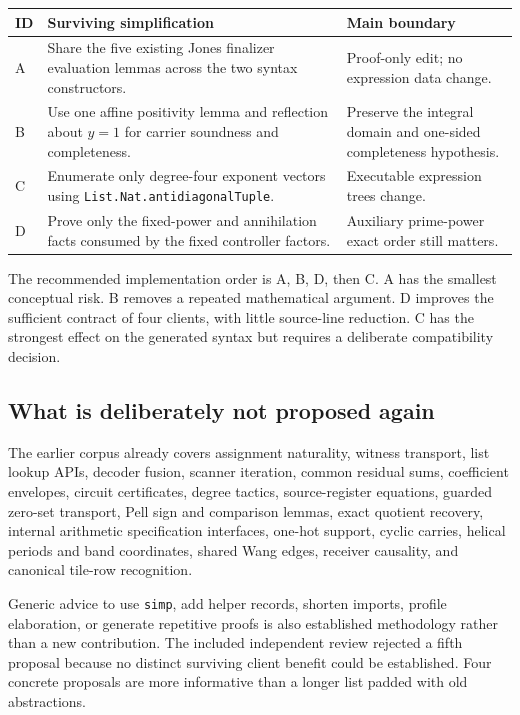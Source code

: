 \documentclass[11pt,letterpaper]{article}
\newcommand{\code}[1]{{\small\nolinkurl{#1}}}
\begin{document}
\begin{tabularx}{\textwidth}{@{}p{}X p{}@{}}
\toprule
ID & Surviving simplification & Main boundary \\
\midrule
A & Share the five existing Jones finalizer evaluation lemmas across the two syntax constructors. & Proof-only edit; no expression data change. \\
B & Use one affine positivity lemma and reflection about $y=1$ for carrier soundness and completeness. & Preserve the integral domain and one-sided completeness hypothesis. \\
C & Enumerate only degree-four exponent vectors using \code{List.Nat.antidiagonalTuple}. & Executable expression trees change. \\
D & Prove only the fixed-power and annihilation facts consumed by the fixed controller factors. & Auxiliary prime-power exact order still matters. \\
\bottomrule
\end{tabularx}

The recommended implementation order is A, B, D, then C. A has the smallest conceptual risk. B removes a repeated mathematical argument. D improves the sufficient contract of four clients, with little source-line reduction. C has the strongest effect on the generated syntax but requires a deliberate compatibility decision.

\subsection{What is deliberately not proposed again}

The earlier corpus already covers assignment naturality, witness transport, list lookup APIs, decoder fusion, scanner iteration, common residual sums, coefficient envelopes, circuit certificates, degree tactics, source-register equations, guarded zero-set transport, Pell sign and comparison lemmas, exact quotient recovery, internal arithmetic specification interfaces, one-hot support, cyclic carries, helical periods and band coordinates, shared Wang edges, receiver causality, and canonical tile-row recognition.\cite{prior,incoming}

Generic advice to use \code{simp}, add helper records, shorten imports, profile elaboration, or generate repetitive proofs is also established methodology rather than a new contribution. The included independent review rejected a fifth proposal because no distinct surviving client benefit could be established. Four concrete proposals are more informative than a longer list padded with old abstractions.
\end{document}
